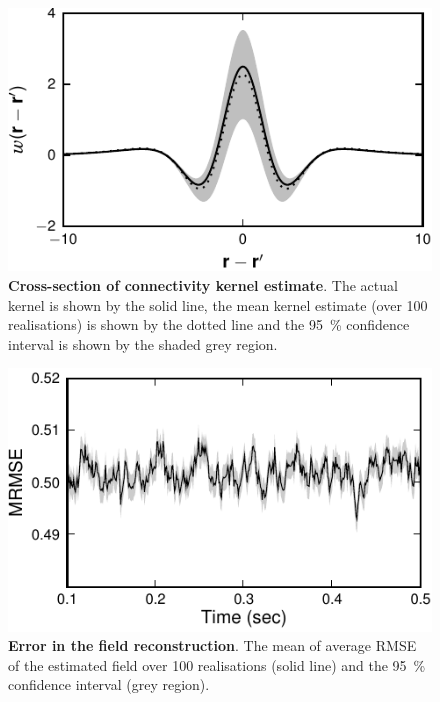 \documentclass[10pt]{article}
\begin{document}
\begin{figure}[!ht]
\begin{center}
\includegraphics{./Graph/pdf/Figure8.pdf}
\end{center}
\caption{{\bf Cross-section of connectivity kernel estimate}. The actual kernel is shown by the solid line, the mean kernel estimate (over 100 realisations) is shown by the dotted line and the 95~\% confidence interval is shown by the shaded grey region.}
\label{fig:KernelEstimates}
\end{figure}

\begin{figure}[!ht]
\begin{center}
\includegraphics{./Graph/pdf/Figure9.pdf} 
\end{center}
\caption{{\bf Error in the field reconstruction}. The mean of average RMSE of the estimated field over 100 realisations (solid line) and the 95~\% confidence interval (grey region).} 
\label{fig:RMSE}
\end{figure}
\end{document}

